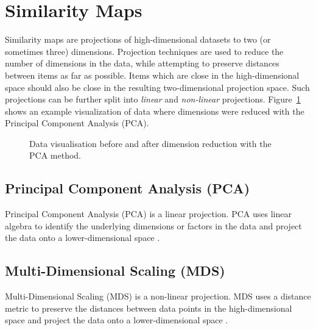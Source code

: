 \section{Similarity Maps}

Similarity maps are projections of high-dimensional datasets to two (or
sometimes three) dimensions. Projection techniques are used to reduce the
number of dimensions in the data, while attempting to preserve distances
between items as far as possible. Items which are close in the
high-dimensional space should also be close in the resulting
two-dimensional projection space. Such projections can be further split
into \emph{linear} and \emph{non-linear} projections.
Figure~\ref{fig:DimRed} shows an example visualization of data where
dimensions were reduced with the Principal Component Analysis (PCA). 

\begin{figure}[tp]
\centering
{}
\hfill         %

\caption[Dimension Reduction with PCA]
{Data visualisation before and after dimension reduction with the PCA
method.
}
\label{fig:DimRed}
\end{figure}


\subsection{Principal Component Analysis (PCA)}

Principal Component Analysis (PCA) is a linear projection. PCA uses
linear algebra to identify the underlying dimensions or factors in the
data and project the data onto a lower-dimensional space
\parencite{abdi2010principal}.


\subsection{Multi-Dimensional Scaling (MDS)}

Multi-Dimensional Scaling (MDS) is a non-linear projection. MDS uses a
distance metric to preserve the distances between data points in the
high-dimensional space and project the data onto a lower-dimensional
space \parencite{morrison2003fast}.


